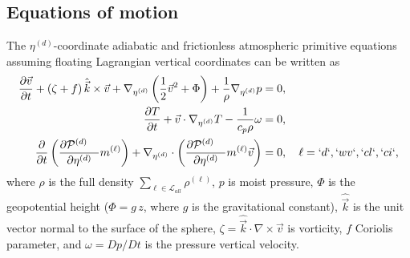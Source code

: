 \documentclass{agujournal}
\begin{document}
{%

%
\subsection{Equations of motion}
The $\eta^{(d)}$-coordinate adiabatic and frictionless atmospheric primitive equations assuming floating Lagrangian vertical coordinates \citep{S1945JAS,L2004MWR} can be written as
\begin{align}
\frac{\partial \vec{v}}{\partial t} + \left( \zeta + f \right) {\hat{\vec{k}}} \times \vec{v}  + \nabla_{\eta^{(d)}} \left( \frac12 \vec{v}^2 + \Phi \right)  + \frac{1}{\rho} \nabla_{\eta^{(d)}} p &= 0,\label{E:PEmom} \\
\frac{\partial T}{\partial t} + \vec{v} \cdot \nabla_{\eta^{(d)}} T  -  \frac{1}{c_p \rho} \omega  &= 0, \label{E:PEtemp} \\
\frac{\partial}{\partial t} \left( \frac{\partial \mathcal{P}^{(d)}\quad }{\partial \eta^{(d)}} m^{(\ell)} \right) +  \nabla_{\eta^{(d)}}\cdot   \left( \frac{\partial \mathcal{P}^{(d)}\quad }{\partial \eta^{(d)}} m^{(\ell)} \vec{v} \right)  &= 0, \quad \ell=`d`,`wv`,`cl`,`ci`, \label{E:PEq}
\end{align}
where $\rho$ is the full density $\sum_{\ell \in \mathcal{L}_{all}} \rho^{(\ell)}$, $p$ is moist pressure, $\Phi$ is the geopotential height ($\Phi=g\, z$, where $g$ is the gravitational constant), ${\hat{\vec{k}}}$ is the unit vector normal to the surface of the sphere, $\zeta = {\hat{\vec{k}}} \cdot {\nabla \times} \vec{v}$ is vorticity, $f$ Coriolis parameter, and $\omega = Dp/Dt$ is the pressure vertical velocity. 

}
\end{document}
